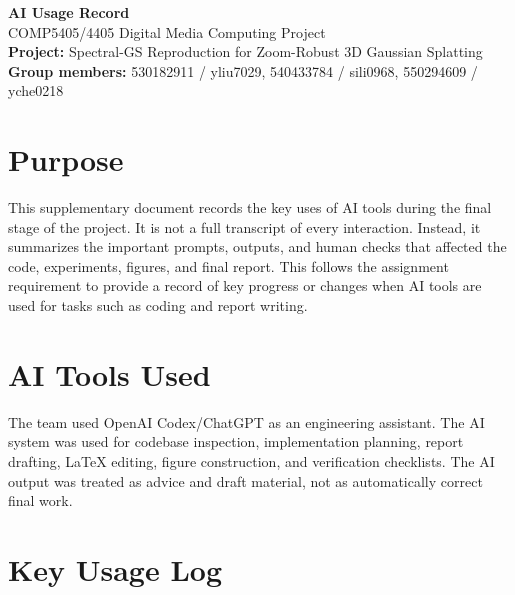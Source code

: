 \documentclass[10pt]{article}
\begin{document}
\begin{center}
{\Large \textbf{AI Usage Record}}\\[4pt]
{\large COMP5405/4405 Digital Media Computing Project}\\[4pt]
\textbf{Project:} Spectral-GS Reproduction for Zoom-Robust 3D Gaussian Splatting\\[4pt]
\textbf{Group members:} 530182911 / yliu7029, 540433784 / sili0968, 550294609 / yche0218
\end{center}

\section*{Purpose}

This supplementary document records the key uses of AI tools during the final stage of the project. It is not a full transcript of every interaction. Instead, it summarizes the important prompts, outputs, and human checks that affected the code, experiments, figures, and final report. This follows the assignment requirement to provide a record of key progress or changes when AI tools are used for tasks such as coding and report writing.

\section*{AI Tools Used}

The team used OpenAI Codex/ChatGPT as an engineering assistant. The AI system was used for codebase inspection, implementation planning, report drafting, LaTeX editing, figure construction, and verification checklists. The AI output was treated as advice and draft material, not as automatically correct final work.

\section*{Key Usage Log}
\end{document}
